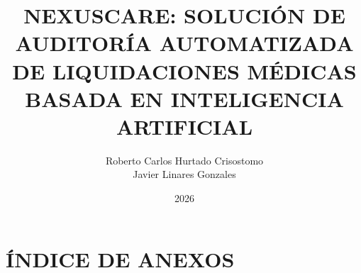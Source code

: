 \documentclass[a4paper, 12pt, oneside]{tesisutec}
\begin{document}
\title{NEXUSCARE: SOLUCIÓN DE AUDITORÍA AUTOMATIZADA DE LIQUIDACIONES MÉDICAS BASADA EN INTELIGENCIA ARTIFICIAL}

\author{Roberto Carlos Hurtado Crisostomo  \\ Javier Linares Gonzales }

\date{2026}

\maketitle
\thispagestyle{empty} 
\setcounter{page}{1}  

\thispagestyle{empty}   
\addtocounter{page}{1}  



\renewcommand{\contentsname}{\Large \bfseries TABLA DE CONTENIDO}




\tableofcontents
\newpage
\renewcommand{\listtablename}{\Large \bfseries ÍNDICE DE TABLAS}
\listoftables
\thispagestyle{empty}
\newpage
\renewcommand{\listfigurename}{\Large \bfseries ÍNDICE DE FIGURAS}
\listoffigures
\thispagestyle{empty}
\newpage
{}


\chapter*{\center \Large \vspace{-4.5cm} ÍNDICE DE ANEXOS}
\listofannexes
\thispagestyle{empty}
\pagestyle{fancy}

 


















\renewcommand{\bibname}{\centering\Large\bf{REFERENCIAS BIBLIOGR\'AFICAS}}
 


\end{document}
